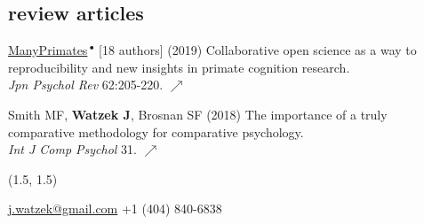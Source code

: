 \documentclass[]{friggeri-cv}
\begin{document}

\subsection{review articles}

\begin{enumerate}[resume, label={[\,\arabic*\,]}]
  \item \ul{ManyPrimates}\,${}^\bullet$ [18 authors] (2019) Collaborative open science as a way to reproducibility and new insights in primate cognition research. \\\emph{Jpn Psychol Rev} 62:205-220. \href{https://manyprimates.github.io/assets/pdfs/ManyPrimates_JPR_2019.pdf}{\small $\nearrow$} \enlargethispage{1.97\baselineskip}
  \item {Smith MF, \textbf{Watzek J}, Brosnan SF (2018) The importance of a truly comparative methodology for comparative psychology. \\\emph{Int J Comp Psychol} 31. \href{https://escholarship.org/uc/item/6x91j98x}{\small $\nearrow$}}
\end{enumerate}



\pagestyle{fancy}

\renewenvironment{aside}{%
  \let\oldsection\section
  \renewcommand{\section}[1]{
    \par\vspace{\baselineskip}{\Large\headingfont\color{headercolor} ##1}
  }
  \begin{textblock}{3.6}(1.5, 1.5)
  \begin{flushright}
  \obeycr
}{%
  \restorecr
  \end{flushright}
  \end{textblock}
  \let\section\oldsection
}


\begin{aside}
  \section{{\normalfont julia}watzek}
    \href{mailto:j.watzek@gmail.com}{j.watzek@gmail.com}
    +1 (404) 840-6838
\end{aside}
\end{document}
